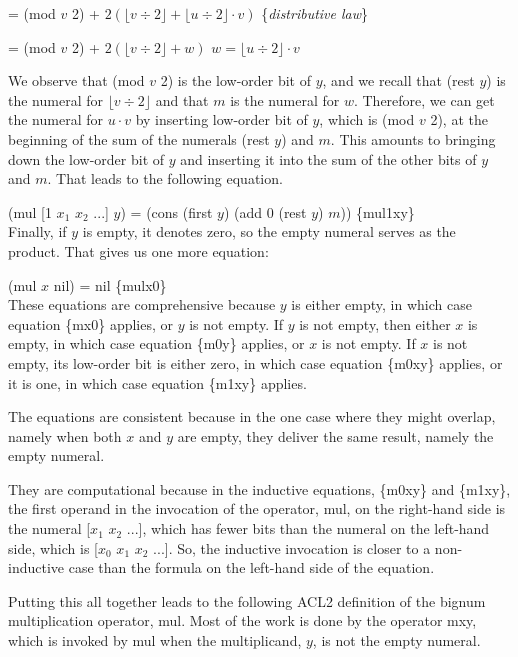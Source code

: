 \hspace{1.7cm} = (mod $v$ 2) + $2(\lfloor v \div 2 \rfloor + \lfloor u \div 2 \rfloor \cdot v)$
\hfill \{\emph{distributive law}\}

\hspace{1.7cm} = (mod $v$ 2) + $2(\lfloor v \div 2 \rfloor + w)$
\hfill $w = \lfloor u \div 2 \rfloor \cdot v$

We observe that (mod $v$ 2) is the low-order bit of $y$,
and we recall that (rest $y$) is the numeral for $\lfloor v \div 2 \rfloor$
and that $m$ is the numeral for $w$.
Therefore, we can get the numeral for $u \cdot v$
by inserting low-order bit of $y$, which is (mod $v$ 2),
at the beginning of the sum of the numerals (rest $y$) and $m$.
This amounts to bringing down the low-order bit of $y$
and inserting it into the sum of the other bits of $y$ and $m$.
That leads to the following equation.

\hspace{2cm} (mul [1 $x_1$ $x_2$ ...] $y$) = (cons (first $y$) (add 0 (rest $y$) $m$)) \hfill \{mul1xy\}
\\

Finally, if $y$ is empty, it denotes zero, so the empty numeral
serves as the product. That gives us one more equation:

\hspace{2cm} (mul $x$ nil) = nil \hfill \{mulx0\}
\\

These equations are comprehensive because $y$ is either empty,
in which case equation \{mx0\} applies,
or $y$ is not empty.
If $y$ is not empty, then either $x$ is empty, in which case
equation \{m0y\} applies, or $x$ is not empty.
If $x$ is not empty, its low-order bit is either zero,
in which case equation \{m0xy\} applies, or it is one,
in which case equation \{m1xy\} applies.

The equations are consistent because in the one case
where they might overlap, namely when both $x$ and $y$
are empty, they deliver the same result, namely the empty numeral.

They are computational because in the inductive equations,
\{m0xy\} and \{m1xy\}, the first operand in
the invocation of the operator, mul, on the right-hand side
is the numeral [$x_1$ $x_2$ ...], which has fewer bits
than the numeral on the left-hand side, which is
[$x_0$ $x_1$ $x_2$ ...].
So, the inductive invocation is closer to a non-inductive
case than the formula on the left-hand side of the equation.

Putting this all together leads to the following ACL2 definition
of the bignum multiplication operator, mul.
Most of the work is done by the operator mxy,
which is invoked by mul when the multiplicand, $y$,
is not the empty numeral.

